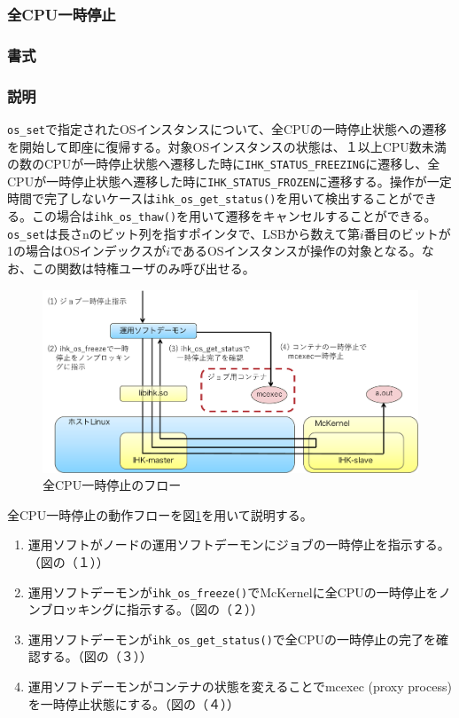 \documentclass[twoside,11pt,fleqn]{book}
\begin{document}
\subsubsection{全CPU一時停止}
\subsubsection*{書式}{\quad} 
\subsubsection*{説明}{\quad} 
\texttt{os\_set}で指定されたOSインスタンスについて、全CPUの一時停止状態への遷移を開始して即座に復帰する。対象OSインスタンスの状態は、１以上CPU数未満の数のCPUが一時停止状態へ遷移した時に\texttt{IHK\_STATUS\_FREEZING}に遷移し、全CPUが一時停止状態へ遷移した時に\texttt{IHK\_STATUS\_FROZEN}に遷移する。操作が一定時間で完了しないケースは\texttt{ihk\_os\_get\_status()}を用いて検出することができる。この場合は\texttt{ihk\_os\_thaw()}を用いて遷移をキャンセルすることができる。\texttt{os\_set}は長さnのビット列を指すポインタで、LSBから数えて第$i$番目のビットが1の場合はOSインデックスが$i$であるOSインスタンスが操作の対象となる。なお、この関数は特権ユーザのみ呼び出せる。

\begin{figure}[!htb]
\centering
\includegraphics[width=14cm]{figs/freeze.pdf}
\vspace{-0em}\caption{全CPU一時停止のフロー}
\label{fig:freeze}
\vspace{-0em}
\end{figure}
%
全CPU一時停止の動作フローを図\ref{fig:freeze}を用いて説明する。
\begin{enumerate}
\item 運用ソフトがノードの運用ソフトデーモンにジョブの一時停止を指示する。（図の（１））
\item 運用ソフトデーモンが\texttt{ihk\_os\_freeze()}でMcKernelに全CPUの一時停止をノンブロッキングに指示する。（図の（２））
\item 運用ソフトデーモンが\texttt{ihk\_os\_get\_status()}で全CPUの一時停止の完了を確認する。（図の（３））
\item 運用ソフトデーモンがコンテナの状態を変えることでmcexec (proxy process)を一時停止状態にする。（図の（４））
\end{enumerate}
%
\FloatBarrier
\end{document}
